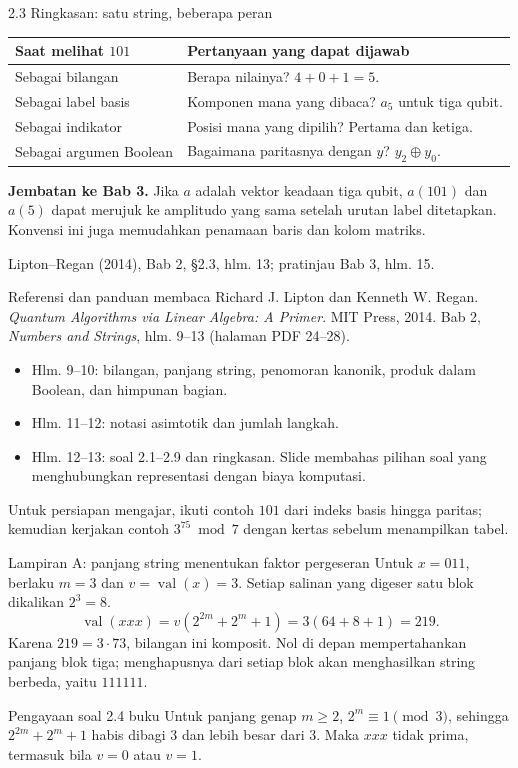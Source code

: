 \documentclass[aspectratio=169,11pt]{beamer}
\newcommand{\bookref}[1]{\par\vfill{\scriptsize\color{gray}Lipton--Regan (2014), Bab 2, #1.}}
\begin{document}
\begin{frame}{2.3 Ringkasan: satu string, beberapa peran}
\begin{center}\begin{tabular}{lp{8.5cm}}\toprule
Saat melihat $101$ & Pertanyaan yang dapat dijawab\\\midrule
Sebagai bilangan & Berapa nilainya? $4+0+1=5$.\\[1mm]
Sebagai label basis & Komponen mana yang dibaca? $a_5$ untuk tiga qubit.\\[1mm]
Sebagai indikator & Posisi mana yang dipilih? Pertama dan ketiga.\\[1mm]
Sebagai argumen Boolean & Bagaimana paritasnya dengan $y$? $y_2\oplus y_0$.\\\bottomrule\end{tabular}\end{center}
\textbf{Jembatan ke Bab 3.} Jika $a$ adalah vektor keadaan tiga qubit, $a(101)$ dan $a(5)$ dapat merujuk ke amplitudo yang sama setelah urutan label ditetapkan. Konvensi ini juga memudahkan penamaan baris dan kolom matriks.
\bookref{\S2.3, hlm. 13; pratinjau Bab 3, hlm. 15}
\end{frame}

\begin{frame}{Referensi dan panduan membaca}
Richard J. Lipton dan Kenneth W. Regan. \textit{Quantum Algorithms via Linear Algebra: A Primer}. MIT Press, 2014. Bab 2, \textit{Numbers and Strings}, hlm. 9--13 (halaman PDF 24--28).
\begin{itemize}
\item Hlm. 9--10: bilangan, panjang string, penomoran kanonik, produk dalam Boolean, dan himpunan bagian.
\item Hlm. 11--12: notasi asimtotik dan jumlah langkah.
\item Hlm. 12--13: soal 2.1--2.9 dan ringkasan. Slide membahas pilihan soal yang menghubungkan representasi dengan biaya komputasi.
\end{itemize}
\par\medskip Untuk persiapan mengajar, ikuti contoh $101$ dari indeks basis hingga paritas; kemudian kerjakan contoh $3^{75}\bmod7$ dengan kertas sebelum menampilkan tabel.
\end{frame}

\appendix
\begin{frame}{Lampiran A: panjang string menentukan faktor pergeseran}
Untuk $x=011$, berlaku $m=3$ dan $v=\operatorname{val}(x)=3$. Setiap salinan yang digeser satu blok dikalikan $2^3=8$.
\[
\operatorname{val}(xxx)=v(2^{2m}+2^m+1)=3(64+8+1)=219.
\]
Karena $219=3\cdot73$, bilangan ini komposit. Nol di depan mempertahankan panjang blok tiga; menghapusnya dari setiap blok akan menghasilkan string berbeda, yaitu $111111$.
\begin{block}{Pengayaan soal 2.4 buku}
Untuk panjang genap $m\ge2$, $2^m\equiv1\pmod3$, sehingga $2^{2m}+2^m+1$ habis dibagi 3 dan lebih besar dari 3. Maka $xxx$ tidak prima, termasuk bila $v=0$ atau $v=1$.
\end{block}
\end{frame}
\end{document}
